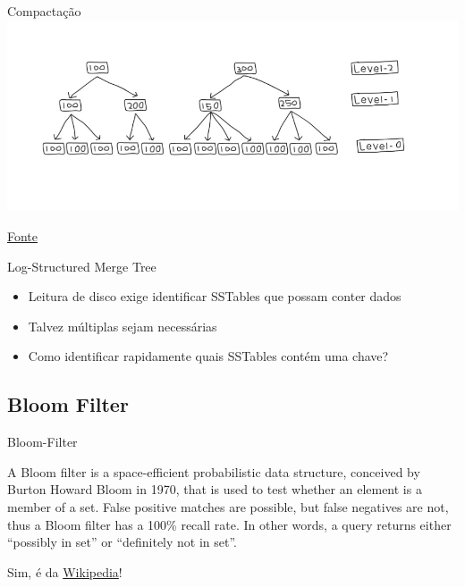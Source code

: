 \begin{frame}{Compactação}
\includegraphics[width=\textwidth]{./images/lsm_compac.png}

\href{https://www.hedvig.io/blog/hedvig-internals-log-structured-merge-trees-and-folding-of-bloom-filters}{Fonte}
\end{frame}



\begin{frame}{Log-Structured Merge Tree}
\begin{itemize}
\item Leitura de disco exige identificar SSTables que possam conter dados
\item Talvez múltiplas sejam necessárias
\item Como identificar rapidamente quais SSTables contém uma chave?
\end{itemize}
\end{frame}




\subsection{Bloom Filter}
\begin{frame}{Bloom-Filter}
\begin{block}{}
	A Bloom filter is a {\color{red}space-efficient} {\color{blue} probabilistic} data structure, conceived by Burton Howard {\color{blue}Bloom} in 1970, that is used to test whether an element is a member of a set. False positive matches are possible, but false negatives are not, thus a Bloom filter has a 100\% recall rate. In other words, a query returns either {\color{blue}``possibly in set''} or {\color{red}``definitely not in set''.}
\end{block}
Sim, é da \href{https://en.wikipedia.org/wiki/Bloom_filter}{Wikipedia}!
\end{frame}


